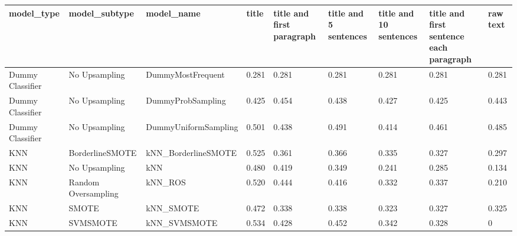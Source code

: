 \begin{tabular}{lllllllll}
\toprule
                  model\_type &       model\_subtype &                                   model\_name & title & title and first paragraph & title and 5 sentences & title and 10 sentences & title and first sentence each paragraph &  raw text \\
\midrule
            Dummy Classifier &       No Upsampling &                            DummyMostFrequent & 0.281 &                     0.281 &                 0.281 &                  0.281 &                                   0.281 &     0.281 \\
            Dummy Classifier &       No Upsampling &                            DummyProbSampling & 0.425 &                     0.454 &                 0.438 &                  0.427 &                                   0.425 &     0.443 \\
            Dummy Classifier &       No Upsampling &                         DummyUniformSampling & 0.501 &                     0.438 &                 0.491 &                  0.414 &                                   0.461 &     0.485 \\
                         KNN &     BorderlineSMOTE &                          kNN\_BorderlineSMOTE & 0.525 &                     0.361 &                 0.366 &                  0.335 &                                   0.327 &     0.297 \\
                         KNN &       No Upsampling &                                          kNN & 0.480 &                     0.419 &                 0.349 &                  0.241 &                                   0.285 &     0.134 \\
                         KNN & Random Oversampling &                                      kNN\_ROS & 0.520 &                     0.444 &                 0.416 &                  0.332 &                                   0.337 &     0.210 \\
                         KNN &               SMOTE &                                    kNN\_SMOTE & 0.472 &                     0.338 &                 0.338 &                  0.323 &                                   0.327 &     0.325 \\
                         KNN &            SVMSMOTE &                                 kNN\_SVMSMOTE & 0.534 &                     0.428 &                 0.452 &                  0.342 &                                   0.328 &         0 \\

\end{tabular}
